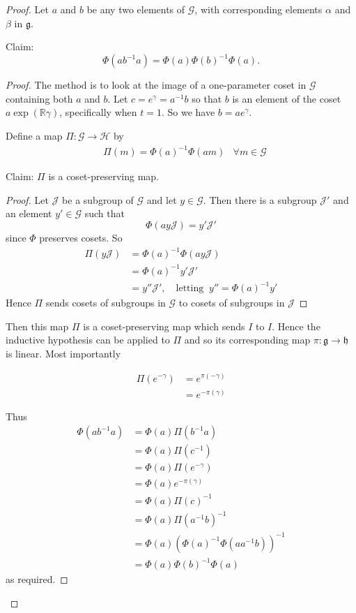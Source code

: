 \documentclass[honours]{UNSWthesis}
\newcommand{\R}{\mathbb{R}}
\newcommand{\G}{\mathcal{G}}
\newcommand{\g}{\mathfrak{g}}
\newcommand{\1}{\mathbf{e}_{1}}
\newcommand{\2}{\mathbf{e}_{3}}
\newcommand{\3}{\mathbf{e}_{3}}
\begin{document}
\begin{proof}
Let $a$ and $b$ be any two elements of $\G$, with corresponding elements $\alpha$ and $\beta$ in $\g$. 

Claim: 
\[
\Phi(ab^{-1}a)=\Phi(a)\Phi(b)^{-1}\Phi(a).
\]
\begin{proof}

The method is to look at the image of a one-parameter coset in $\G$ containing both $a$ and $b$. 
Let $c=e^{\gamma}=a^{-1}b$ so that $b$ is an element of the coset $a\exp(\R\gamma)$, specifically when $t=1$. 
So we have $b=ae^{\gamma}$.

Define a map $ \Pi:\G \longrightarrow \mathcal{H} $ by 
\begin{align*}
&\Pi(m)=\Phi(a)^{-1}\Phi(am) & \forall m \in \G
\end{align*}

Claim: $\Pi$ is a coset-preserving map.

\begin{proof}
Let $\mathcal{J}$ be a subgroup of $\G$ and let $y \in \G$. Then there is a subgroup $\mathcal{J}'$ and an element $y' \in \G$ such that 
\[
\Phi(ay\mathcal{J}) = y'\mathcal{J}'
\]
since $\Phi$ preserves cosets. 
So 
\begin{align*}
\Pi(y\mathcal{J}) &= \Phi(a)^{-1} \Phi(ay\mathcal{J}) \\
&= \Phi(a)^{-1}y'\mathcal{J}' \\
&= y''\mathcal{J}',\quad \text{letting}\;\; y''=\Phi(a)^{-1}y'
\end{align*}
Hence $\Pi$ sends cosets of subgroups in $\G$ to cosets of subgroups in $\mathcal{J}$ 
\end{proof}

Then this map $\Pi$ is a coset-preserving map which sends $I$ to $I$. Hence the inductive hypothesis can be applied to $\Pi$ and so its corresponding map $\pi: \g \longrightarrow \mathfrak{h}$ is linear.
Most importantly 

\begin{align*}
\Pi(e^{-\gamma}) &= e^{\pi(-\gamma)} \\
&= e^{-\pi(\gamma)}
\end{align*}

Thus 
\begin{align*}
\Phi(ab^{-1}a) &= \Phi(a)\Pi(b^{-1}a)\\
&= \Phi(a)\Pi(c^{-1})\\
&= \Phi(a) \Pi(e^{-\gamma}) \\
&= \Phi(a) e^{-\pi(\gamma)} \\
&= \Phi(a) \Pi(c)^{-1} \\
&= \Phi(a) \Pi(a^{-1}b)^{-1} \\
&= \Phi(a) (\Phi(a)^{-1}\Phi(aa^{-1}b))^{-1} \\
&= \Phi(a) \Phi(b)^{-1} \Phi(a)
\end{align*}
as required. 


\end{proof}
\end{proof}
\end{document}
